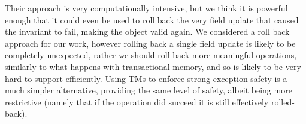 Their approach is very computationally intensive, but we think it is powerful enough that it could even be used to roll back the very field update that caused the invariant to fail, making the object valid again.
We considered a roll back approach for our work, however rolling back a single field update is likely to be completely unexpected, rather we should roll back more meaningful operations, similarly to what happens
with transactional memory, and so is likely to be very hard to support efficiently.
Using TMs to enforce strong exception safety is a much simpler alternative, providing the same level of safety, albeit being more restrictive (namely that if the operation did succeed it is still effectively rolled-back).



{}

